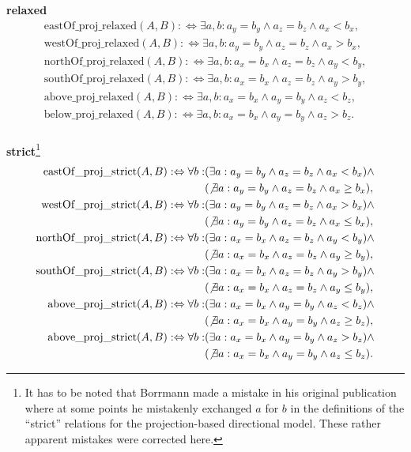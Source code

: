 \documentclass[paper=a4, fontsize=11pt]{scrartcl} %
\numberwithin{equation}{section} %
\numberwithin{figure}{section} %
\numberwithin{table}{section} %
\begin{document}
\textbf{relaxed}
\begin{align*}
  \mathrm{eastOf\_proj\_relaxed}(A,B) :\Leftrightarrow \exists a,b:a_y=b_y\wedge a_z=b_z\wedge a_x<b_x, \\
  \mathrm{westOf\_proj\_relaxed}(A,B) :\Leftrightarrow \exists a,b:a_y=b_y\wedge a_z=b_z\wedge a_x>b_x, \\
  \mathrm{northOf\_proj\_relaxed}(A,B) :\Leftrightarrow \exists a,b:a_x=b_x\wedge a_z=b_z\wedge a_y<b_y, \\
  \mathrm{southOf\_proj\_relaxed}(A,B) :\Leftrightarrow \exists a,b:a_x=b_x\wedge a_z=b_z\wedge a_y>b_y, \\
  \mathrm{above\_proj\_relaxed}(A,B) :\Leftrightarrow \exists a,b:a_x=b_x\wedge a_y=b_y\wedge a_z<b_z, \\
  \mathrm{below\_proj\_relaxed}(A,B) :\Leftrightarrow \exists a,b:a_x=b_x\wedge a_y=b_y\wedge a_z>b_z. \\
\end{align*}

\textbf{strict}\footnote{It has to be noted that Borrmann made a mistake in his original publication \cite{Borrmann:2009:AEI} where at some points he mistakenly exchanged $a$ for $b$ in the definitions of the ``strict'' relations for the projection-based directional model. These rather apparent mistakes were corrected here.} 
\begin{align*}
  \mathrm{eastOf\_proj\_strict}(A,B) :\Leftrightarrow \forall b:&(\exists a:a_y=b_y\wedge a_z=b_z\wedge a_x<b_x) \wedge \\&(\not\exists a:a_y=b_y\wedge a_z=b_z\wedge a_x\ge b_x), \\
  \mathrm{westOf\_proj\_strict}(A,B) :\Leftrightarrow \forall b:&(\exists a:a_y=b_y\wedge a_z=b_z\wedge a_x>b_x) \wedge \\&(\not\exists a:a_y=b_y\wedge a_z=b_z\wedge a_x\le b_x), \\
  \mathrm{northOf\_proj\_strict}(A,B) :\Leftrightarrow \forall b:&(\exists a:a_x=b_x\wedge a_z=b_z\wedge a_y<b_y) \wedge \\&(\not\exists a:a_x=b_x\wedge a_z=b_z\wedge a_y\ge b_y), \\
  \mathrm{southOf\_proj\_strict}(A,B) :\Leftrightarrow \forall b:&(\exists a:a_x=b_x\wedge a_z=b_z\wedge a_y>b_y) \wedge \\&(\not\exists a:a_x=b_x\wedge a_z=b_z\wedge a_y\le b_y), \\
  \mathrm{above\_proj\_strict}(A,B) :\Leftrightarrow \forall b:&(\exists a:a_x=b_x\wedge a_y=b_y\wedge a_z<b_z) \wedge \\&(\not\exists a:a_x=b_x\wedge a_y=b_y\wedge a_z\ge b_z), \\
  \mathrm{above\_proj\_strict}(A,B) :\Leftrightarrow \forall b:&(\exists a:a_x=b_x\wedge a_y=b_y\wedge a_z>b_z) \wedge \\&(\not\exists a:a_x=b_x\wedge a_y=b_y\wedge a_z\le b_z).
\end{align*}
\end{document}
